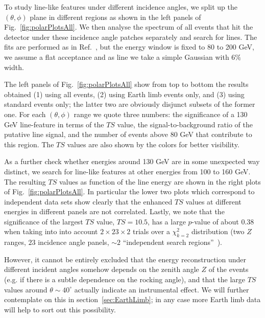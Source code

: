 \documentclass[aps,twocolumn,prd,superscriptaddress,showpacs,nofootinbib,fixfloat]{revtex4}
\begin{document}
To study line-like features under different incidence
angles, we split up the $(\theta, \phi)$ plane in different
regions as shown in the left panels of
Fig.~\ref{fig:polarPlotsAll}. We then analyse the spectrum
of all events that hit the detector under these incidence
angle patches separately and search for lines. The fits are
performed as in Ref.~\cite{Weniger:2012}, but the energy
window is fixed to 80 to 200 GeV, we assume a flat
acceptance and as line we take a simple Gaussian with $6\%$
width.

The left panels of Fig.~\ref{fig:polarPlotsAll} show from
top to bottom the results obtained (1) using all events, (2)
using Earth limb events only, and (3) using standard events
only; the latter two are obviously disjunct subsets of the
former one. For each $(\theta, \phi)$ range we quote three
numbers: the significance of a 130 GeV line-feature in terms
of the $TS$ value, the signal-to-background ratio of the
putative line signal, and the number of events above 80 GeV
that contribute to this region. The $TS$ values are also
shown by the colors for better visibility.


As a further check whether energies around 130 GeV are in
some unexpected way distinct, we search for line-like
features at other energies from 100 to 160 GeV. The
resulting $TS$ values as function of the line energy are
shown in the right plots of Fig.~\ref{fig:polarPlotsAll}. In
particular the lower two plots which correspond to
independent data sets show clearly that the enhanced $TS$
values at different energies in different panels are not
correlated. Lastly, we note that the significance of the
largest $TS$ value, $TS=10.5$, has a large $p$-value of
about $0.38$ when taking into into account
$2\times23\times2$ trials over a $\chi_{k=2}^2$ distribution
(two $Z$ ranges, $23$ incidence angle panels, $\sim2$
``independent search regions''~\cite{Vittels}).

However, it cannot be entirely excluded that the energy
reconstruction under different incident angles somehow
depends on the zenith angle $Z$ of the events (e.g. if there
is a subtle dependence on the rocking angle), and that the
large $TS$ values around $\theta\sim40^\circ$ actually
indicate an instrumental effect. We will further contemplate
on this in section~\ref{sec:EarthLimb}; in any case more
Earth limb data will help to sort out this possibility.
\end{document}
